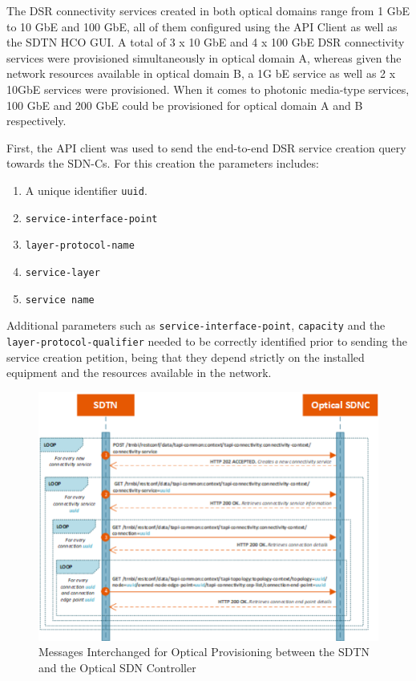 \documentclass[a4paper,fleqn]{cas-dc}
\begin{document}
The DSR connectivity services created in both optical domains range from 1 GbE to 10 GbE and 100 GbE, all of them configured using the API Client as well as the SDTN HCO GUI. A total of 3 x 10 GbE and 4 x 100 GbE DSR connectivity services were provisioned simultaneously  in optical domain A, whereas given the network resources available in optical domain B, a 1G bE service as well as 2 x 10GbE services were provisioned. When it comes to photonic media-type services, 100 GbE and 200 GbE could be provisioned for optical domain A and B respectively. 

First, the API client was used to send the end-to-end DSR service creation query towards the SDN-Cs. For this creation the parameters includes: 
\begin{enumerate}
    \item A unique identifier \texttt{uuid}.
    \item \texttt{service-interface-point}
    \item \texttt{layer-protocol-name}
    \item \texttt{service-layer}
    \item \texttt{service name}
\end{enumerate}

Additional parameters such as \texttt{service-interface-point}, \texttt{capacity} and the \texttt{layer-protocol-qualifier} needed to be correctly identified prior to sending the service creation petition, being that they depend strictly on the installed equipment and the resources available in the network.

\begin{figure}
	\centering
		\includegraphics[width=\linewidth]{figs/optical_provisioning_workflow_2.png}
	\caption{Messages Interchanged for Optical Provisioning between the SDTN and the Optical SDN Controller}
	\label{FIG:optical_provisioning_workflow}
\end{figure}
\end{document}
